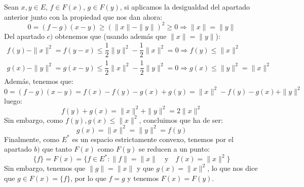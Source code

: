 \begin{ejercicio}
\begin{enumerate}[label=\alph*)]
            \noindent
            Sean $x,y\in E$, $f\in F(x)$, $g\in F(y)$, si aplicamos la desigualdad del apartado anterior junto con la propiedad que nos dan ahora:
            \begin{equation*}
                0 = (f-g)(x-y) \geq {(\|x\|-\|y\|)}^{2}\geq 0 \Longrightarrow \|x\| = \|y\|
            \end{equation*}
            Del apartado $c)$ obtenemos que (usando además que $\|x\|=\|y\|$):
            \begin{gather*}
                f(y) - \|x\|^2 = f(y-x) \leq \dfrac{1}{2}\|y\|^2 - \dfrac{1}{2}\|x\|^2 = 0 \Longrightarrow f(y)\leq \|x\|^2 \\
                g(x) - \|y\|^2 = g(x-y) \leq \dfrac{1}{2}\|x\|^2 - \dfrac{1}{2}\|y\|^2 = 0 \Longrightarrow g(x) \leq \|y\|^2 = \|x\|^2
            \end{gather*}
            Además, tenemos que:
            \begin{equation*}
                0 = (f-g)(x-y) = f(x)-f(y)-g(x)+g(y) = \|x\|^2 -f(y)-g(x)+\|y\|^2 
            \end{equation*}
            luego:
            \begin{equation*}
                f(y)+g(x) = \|x\|^2 + \|y\|^2 = 2\|x\|^2
            \end{equation*}
            Sin embargo, como $f(y),g(x)\leq \|x\|^2$, concluimos que ha de ser:
            \begin{equation*}
                g(x) = \|x\|^2 = \|y\|^2 = f(y)
            \end{equation*}
            Finalmente, como $E^\ast$ es un espacio estrictamente convexo, tenemos por el apartado $b)$ que tanto $F(x)$ como $F(y)$ se reducen a un punto:
            \begin{equation*}
                \{f\} = F(x) = \{f\in E^\ast : \|f\| = \|x\| \quad \text{y}\quad f(x)=\|x\|^2\}
            \end{equation*}
            Sin embargo, tenemos que $\|g\| = \|x\|$ y que $g(x) = \|x\|^2$, lo que nos dice que $g\in F(x) = \{f\}$, por lo que $f=g$ y tenemos $F(x) = F(y)$.
    \end{enumerate}
\end{ejercicio}

